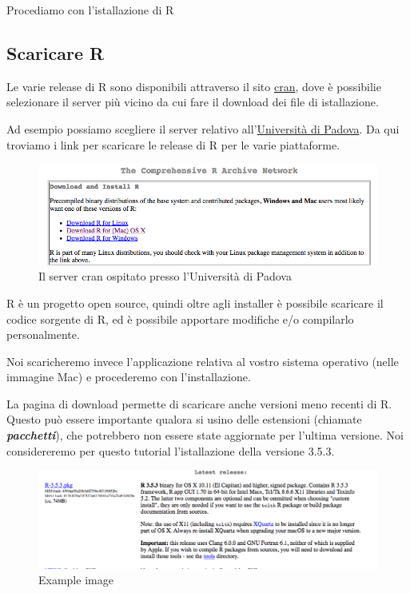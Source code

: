 \documentclass[]{book}
\begin{document}
Procediamo con l'istallazione di R

\hypertarget{scaricare-r}{%
\subsection{Scaricare R}\label{scaricare-r}}

Le varie release di R sono disponibili attraverso il sito \href{https://cran.r-project.org/}{cran}, dove è possibilie selezionare il server più vicino da cui fare il download dei file di istallazione.

Ad esempio possiamo scegliere il server relativo all'\href{https://cran.stat.unipd.it/}{Università di Padova}. Da qui troviamo i link per scaricare le release di R per le varie piattaforme.

\begin{figure}
\centering
\includegraphics{./media/cran_unipa.png}
\caption{Il server cran ospitato presso l'Università di Padova}
\end{figure}

R è un progetto open source, quindi oltre agli installer è possibile scaricare il codice sorgente di R, ed è possibile apportare modifiche e/o compilarlo personalmente.

Noi scaricheremo invece l'applicazione relativa al vostro sistema operativo (nelle immagine Mac) e procederemo con l'installazione.

La pagina di download permette di scaricare anche versioni meno recenti di R.
Questo può essere importante qualora si usino delle estensioni (chiamate \textbf{\emph{pacchetti}}), che potrebbero non essere state aggiornate per l'ultima versione. Noi considereremo per questo tutorial l'istallazione della versione 3.5.3.

\begin{figure}
\centering
\includegraphics{./media/R353down.png}
\caption{Example image}
\end{figure}
\end{document}
